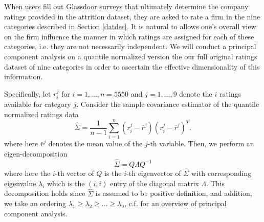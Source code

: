 \documentclass[10pt]{article}
\begin{document}
When users fill out Glassdoor surveys that ultimately determine the 
company ratings provided in the attrition dataset, they are asked to 
rate a firm in the nine categories described in Section \ref{datdes}.
It is natural to allows one's overall view on the firm influence 
the manner in which ratings are assigned for each of these
categories, i.e. they are not necessarily independent.  We will 
conduct a principal component analysis on a quantile normalized 
version the our full original ratings dataset of nine categories in 
order to ascertain the effective dimensionality of this information. 

Specifically, let $r_i^j$ for $i=1,\ldots,n=5550$ and $j=1,\ldots,9$ denote 
the $i$ ratings available for category $j$. Consider the sample covariance 
estimator of the quantile normalized ratings data
%
\begin{equation}
    \hat{\Sigma} = \frac{1}{n-1}\sum_{i=1}^n (r_i^j-\bar{r}^j)(r_i^j-\bar{r}^j)^T. 
\end{equation}
%
where here $\bar{r}^j$ denotes the mean value of the $j$-th variable.  Then, we 
perform an eigen-decomposition 
%
\begin{equation}
    \hat{\Sigma} = Q\Lambda Q^{-1}
\end{equation}
%
where here the $i$-th vector of $Q$ is the $i$-th eigenvector of $\hat{\Sigma}$ with 
corresponding eigenvalue $\lambda_i$ which is the $(i,i)$ entry of the diagonal matrix 
$\Lambda$.  This decomposition holds since $\hat{\Sigma}$ is assumed to be positive 
definition, and addition, we take an ordering $\lambda_1\geq\lambda_2\geq \ldots\geq \lambda_9$,
c.f. \cite{Shlens05atutorial} for an overview of principal component analysis.
\end{document}
